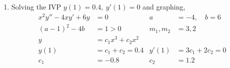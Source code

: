 \begin{enumerate}
    \item Solving the IVP $ y(1) = 0.4,\ y'(1) = 0 $ and graphing,
          \begin{align}
              x^{2}y'' - 4xy' + 6y & = 0                       & a            & = -4, \quad b= 6      \\
              (a-1)^{2}-4b         & = 1 > 0                   & m_{1}, m_{2} & =  3, 2               \\
              y                    & = c_{1}x^{3} + c_{2}x^{2}                                        \\
              y(1)                 & = c_{1} + c_{2} = 0.4     & y'(1)        & = 3c_{1} + 2c_{2} = 0 \\
              c_{1}                & = -0.8                    & c_{2}        & = 1.2
          \end{align}
          \begin{figure}[H]
              \centering
          \end{figure}


\end{enumerate}
